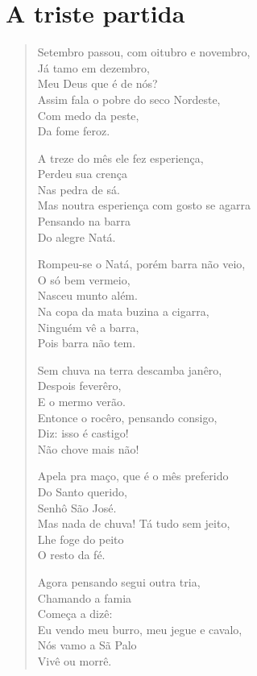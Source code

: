\chapter{A triste partida}

\begin{verse}
Setembro passou, com oitubro e novembro,\\
Já tamo em dezembro,\\
Meu Deus que é de nós?\\
Assim fala o pobre do seco Nordeste,\\
Com medo da peste,\\
Da fome feroz.

A treze do mês ele fez esperiença,\\
Perdeu sua crença\\
Nas pedra de sá.\\
Mas noutra esperiença com gosto se agarra\\
Pensando na barra\\
Do alegre Natá.

Rompeu-se o Natá, porém barra não veio,\\
O só bem vermeio,\\
Nasceu munto além.\\
Na copa da mata buzina a cigarra,\\
Ninguém vê a barra,\\
Pois barra não tem.

Sem chuva na terra descamba janêro,\\
Despois feverêro,\\
E o mermo verão.\\
Entonce o rocêro, pensando consigo,\\
Diz: isso é castigo!\\
Não chove mais não!

Apela pra maço, que é o mês preferido\\
Do Santo querido,\\
Senhô São José.\\
Mas nada de chuva! Tá tudo sem jeito,\\
Lhe foge do peito\\
O resto da fé.

Agora pensando segui outra tria,\\
Chamando a famia\\
Começa a dizê:\\
Eu vendo meu burro, meu jegue e cavalo,\\
Nós vamo a Sã Palo\\
Vivê ou morrê.


\end{verse}
